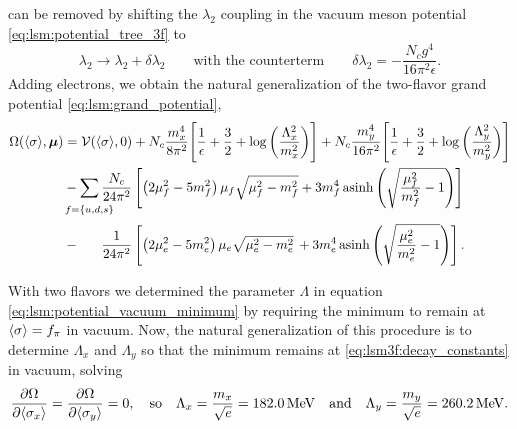 can be removed by shifting the $\lambda_2$ coupling in the vacuum meson potential \eqref{eq:lsm:potential_tree_3f} to
\begin{equation}
	\lambda_2 \rightarrow \lambda_2 + \delta\lambda_2 \qquad \text{with the counterterm} \qquad \delta\lambda_2 = -\frac{N_c g^4}{16 \pi^2 \epsilon} .
\end{equation}
Adding electrons, we obtain the natural generalization of the two-flavor grand potential \eqref{eq:lsm:grand_potential},
\begin{equation}
\begin{split}
	\Omega(\avg{\sigma},\vec{\mu}) &= \pot(\avg{\sigma},0) + N_c \frac{m_x^4}{8 \pi^2} \Bigg[ \frac{1}{\epsilon} + \frac{3}{2} + \log\bigg(\frac{\Lambda_x^2}{m_x^2}\bigg) \Bigg] + N_c \frac{m_y^4}{16 \pi^2} \Bigg[ \frac{1}{\epsilon} + \frac{3}{2} + \log\bigg(\frac{\Lambda_y^2}{m_y^2}\bigg) \Bigg] \\ %
	                               &-\smashoperator{\sum_{\vphantom{\big|} f=\{u,d,s\}}} \frac{N_c}{24 \pi^2} \left[ \left( 2 \mu_f^2 - 5 m_f^2 \right) \mu_f \sqrt{\mu_f^2 - m_f^2} + 3 m_f^4 \asinh \left( \sqrt{\frac{\mu_{\smash{f}}^2}{m_f^2}-1} \right) \right] \\
	                               &-\phantom{\sum} \, \frac{1}{24 \pi^2} \left[ \left( 2 \mu_e^2 - 5 m_e^2 \right) \mu_e \sqrt{\mu_e^2 - m_e^2} \, + 3 m_e^4 \asinh \left( \sqrt{\frac{\mu_{\smash{e}}^2}{m_e^2}-1} \right) \right].
\end{split}
\label{eq:lsm3f:grand_potential}
\end{equation}

With two flavors we determined the parameter $\Lambda$ in equation \eqref{eq:lsm:potential_vacuum_minimum} by requiring the minimum to remain at $\langle \sigma \rangle=f_\pi$ in vacuum.
Now, the natural generalization of this procedure is to determine $\Lambda_x$ and $\Lambda_y$ so that the minimum remains at \eqref{eq:lsm3f:decay_constants} in vacuum, solving
\begin{equation}
	\pdv{\Omega}{ \langle \sigma_x \rangle} = \pdv{\Omega}{ \langle \sigma_y \rangle} = 0,
	\quad \text{so}
	\quad \Lambda_x = \frac{m_x}{\sqrt{e}} = \SI{182.0}{\mega\electronvolt}
	\quad \text{and} \quad
	\Lambda_y = \frac{m_y}{\sqrt{e}} = \SI{260.2}{\mega\electronvolt}.
\end{equation}

